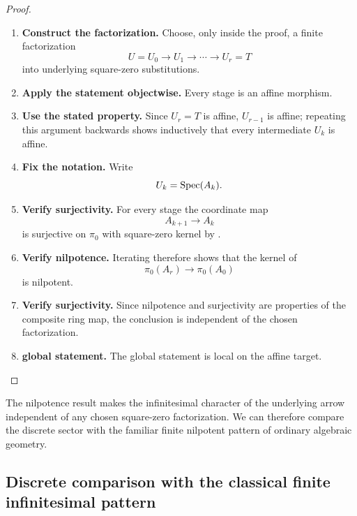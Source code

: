 \begin{proof}
\leavevmode
\begin{enumerate}[label=\textup{(\arabic*)}]
    \item \textbf{Construct the factorization.}
    Choose, only inside the proof, a finite factorization
    \[
        U=U_0\longrightarrow U_1\longrightarrow\cdots\longrightarrow U_r=T
    \]
    into underlying square-zero substitutions.

    \item \textbf{Apply the statement objectwise.}
    Every stage is an affine morphism.

    \item \textbf{Use the stated property.}
    Since \(U_r=T\) is affine, \(U_{r-1}\) is affine; repeating this argument backwards shows
    inductively that every intermediate \(U_k\) is affine.

    \item \textbf{Fix the notation.}
    Write
    \[
        U_k=\operatorname{Spec}(A_k).
    \]

    \item \textbf{Verify surjectivity.}
    For every stage the coordinate map
    \[
        A_{k+1}\longrightarrow A_k
    \]
    is surjective on \(\pi_0\) with square-zero kernel by
    .

    \item \textbf{Verify nilpotence.}
    Iterating  therefore shows that the kernel of
    \[
        \pi_0(A_r)\longrightarrow\pi_0(A_0)
    \]
    is nilpotent.

    \item \textbf{Verify surjectivity.}
    Since nilpotence and surjectivity are properties of the composite ring map, the conclusion
    is independent of the chosen factorization.

    \item \textbf{global statement.}
    The global statement is local on the affine target.
\end{enumerate}
\end{proof}
The nilpotence result makes the infinitesimal character of the underlying
arrow independent of any chosen square-zero factorization. We can therefore
compare the discrete sector with the familiar finite nilpotent pattern of
ordinary algebraic geometry.

\subsection{Discrete comparison with the classical finite infinitesimal pattern}

